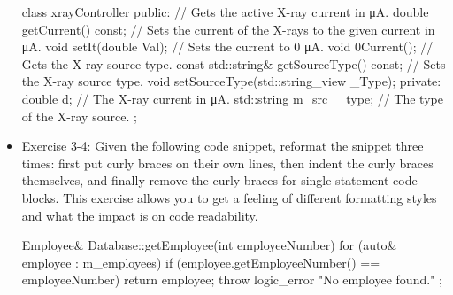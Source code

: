 \begin{itemize}
\begin{cpp}
class xrayController
{
    public:
        // Gets the active X-ray current in μA.
        double getCurrent() const;
        // Sets the current of the X-rays to the given current in μA.
        void setIt(double Val);
        // Sets the current to 0 μA.
        void 0Current();
        // Gets the X-ray source type.
        const std::string& getSourceType() const;
        // Sets the X-ray source type.
        void setSourceType(std::string_view _Type);
    private:
        double d; // The X-ray current in μA.
        std::string m_src__type; // The type of the X-ray source.
};
\end{cpp}

\item
Exercise 3-4: Given the following code snippet, reformat the snippet three times: first put curly braces on their own lines, then indent the curly braces themselves, and finally remove the curly braces for single-statement code blocks. This exercise allows you to get a feeling of different formatting styles and what the impact is on code readability.

\begin{cpp}
Employee& Database::getEmployee(int employeeNumber)
{
    for (auto& employee : m_employees) {
        if (employee.getEmployeeNumber() == employeeNumber) {
            return employee;
        }
    }
    throw logic_error { "No employee found." };
}
\end{cpp}
\end{itemize}